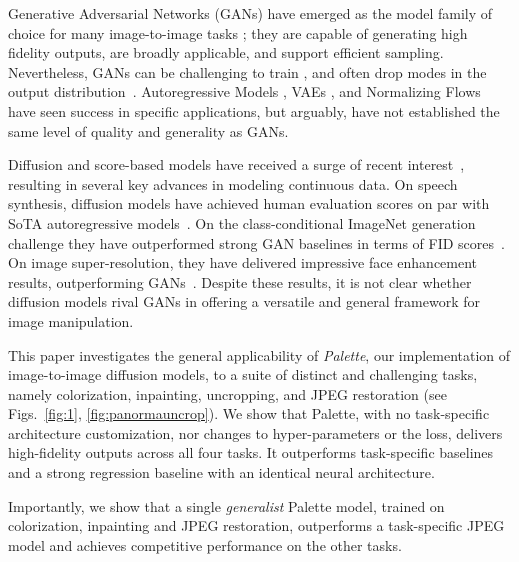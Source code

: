 Generative Adversarial Networks (GANs) \citep{goodfellow2014generative,radford2015unsupervised} have emerged as the model family of choice for many image-to-image tasks \citep{isola-cvpr-2017}; they are capable of generating high fidelity outputs, are broadly applicable, and support efficient sampling. Nevertheless, GANs can be challenging to train \cite{arjovsky-arxiv-2017,gulrajani2017improved}, and often drop modes in the output distribution~\cite{metz2016unrolled,ravuri2019classification}. Autoregressive Models \citep{oord2016conditional,parmar2018image}, VAEs \citep{Kingma2013,vahdat2021nvae}, and Normalizing Flows \citep{dinh2016density,Kingma2018} have seen success in specific applications, but arguably, have not established the same level of quality and generality as GANs.  

Diffusion and score-based models \citep{sohl2015deep,song-arxiv-2020,ho2020denoising} have received a surge of recent interest~\cite{cai-eccv-2020,song-iclr-2021,hoogeboom2021argmax,vahdat2021score,kingma2021variational,austin2021structured}, resulting in several key advances in modeling continuous data. On speech synthesis, diffusion models have achieved human evaluation scores on par with SoTA autoregressive models~\citep{chen-iclr-2021,chen-interspeech-2021,kong-arxiv-2020}. On the class-conditional ImageNet generation challenge they have outperformed strong GAN baselines in terms of FID scores~\citep{dhariwal2021diffusion,ho-arxiv-2021}. On image super-resolution, they have delivered impressive face enhancement results, outperforming GANs~\citep{saharia2021image}. Despite these results, it is not clear whether diffusion models rival GANs in offering a versatile and general framework for image manipulation.

This paper investigates the general applicability of {\em Palette}, our implementation of image-to-image diffusion models, to a suite of  distinct and challenging tasks, namely colorization, inpainting, uncropping, and JPEG restoration (see Figs.\ \ref{fig:1}, \ref{fig:panormauncrop}).
We show that Palette, with no task-specific architecture customization, nor changes to hyper-parameters or the loss,  delivers high-fidelity outputs across all four tasks. It outperforms task-specific baselines and a strong regression baseline with an identical neural architecture.

Importantly, we show that a single {\em generalist} Palette model, trained on colorization, inpainting and JPEG restoration, outperforms a task-specific JPEG model and achieves competitive performance on the other tasks.

